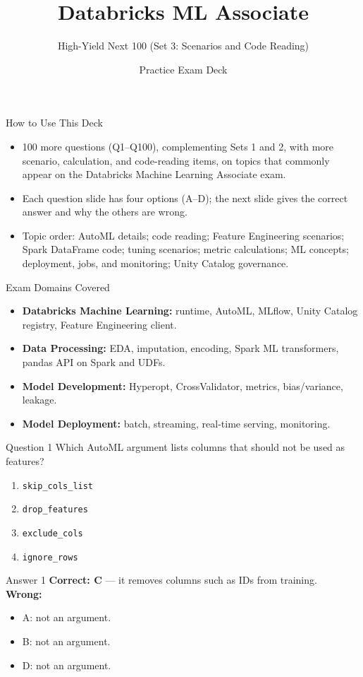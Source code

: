 \documentclass[aspectratio=169,11pt]{beamer}
\title{Databricks ML Associate}
\subtitle{High-Yield Next 100 (Set 3: Scenarios and Code Reading)}
\author{Practice Exam Deck}
\date{}
\begin{document}
\begin{frame}
\titlepage
\end{frame}

\begin{frame}{How to Use This Deck}
\begin{itemize}
\item 100 more questions (Q1--Q100), complementing Sets 1 and 2, with more scenario, calculation, and code-reading items, on topics that commonly appear on the Databricks Machine Learning Associate exam.
\item Each question slide has four options (A--D); the next slide gives the correct answer and why the others are wrong.
\item Topic order: AutoML details; code reading; Feature Engineering scenarios; Spark DataFrame code; tuning scenarios; metric calculations; ML concepts; deployment, jobs, and monitoring; Unity Catalog governance.
\end{itemize}
\end{frame}

\begin{frame}{Exam Domains Covered}
\begin{itemize}
\item \textbf{Databricks Machine Learning:} runtime, AutoML, MLflow, Unity Catalog registry, Feature Engineering client.
\item \textbf{Data Processing:} EDA, imputation, encoding, Spark ML transformers, pandas API on Spark and UDFs.
\item \textbf{Model Development:} Hyperopt, CrossValidator, metrics, bias/variance, leakage.
\item \textbf{Model Deployment:} batch, streaming, real-time serving, monitoring.
\end{itemize}
\end{frame}

\begin{frame}{Question 1}
Which AutoML argument lists columns that should not be used as features?
\begin{enumerate}[label=\Alph*.]
\item \texttt{skip\_cols\_list}
\item \texttt{drop\_features}
\item \texttt{exclude\_cols}
\item \texttt{ignore\_rows}
\end{enumerate}
\end{frame}
\begin{frame}{Answer 1}
\textbf{Correct: C} --- it removes columns such as IDs from training.\\
\vspace{0.5em}
\textbf{Wrong:}
\begin{itemize}
\item A: not an argument.
\item B: not an argument.
\item D: not an argument.
\end{itemize}
\end{frame}
\end{document}
